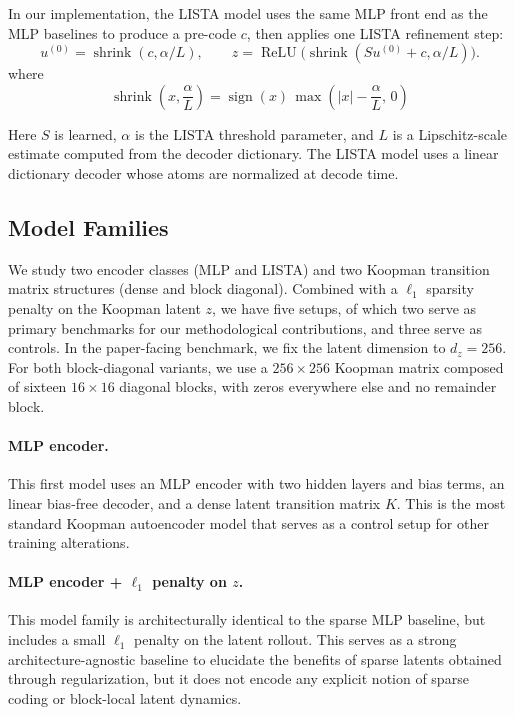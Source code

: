 In our implementation, the LISTA model uses the same MLP front end as the MLP baselines to produce a pre-code $c$, then applies one LISTA refinement step:
\begin{equation}
\label{eq:lista-refinement-step}
u^{(0)} = \operatorname{shrink}(c, \alpha/L),
\qquad
z = \operatorname{ReLU}\!\bigl(\operatorname{shrink}(S u^{(0)} + c, \alpha/L)\bigr).
\end{equation}
where
\begin{equation}
\operatorname{shrink}\!\left(x, \frac{\alpha}{L}\right)
  =
  \operatorname{sign}(x)\,\max\!\left(|x| - \frac{\alpha}{L},\, 0\right)
\end{equation}

Here $S$ is learned, $\alpha$ is the LISTA threshold parameter, and $L$ is a Lipschitz-scale estimate computed from the decoder dictionary. The LISTA model uses a linear dictionary decoder whose atoms are normalized at decode time.

\subsection{Model Families}

We study two encoder classes (MLP and LISTA) and two Koopman transition matrix structures (dense and block diagonal). Combined with a $\ell_1$ sparsity penalty on the Koopman latent $z$, we have five setups, of which two serve as primary benchmarks for our methodological contributions, and three serve as controls.
In the paper-facing benchmark, we fix the latent dimension to $d_z = 256$. For both block-diagonal variants, we use a $256 \times 256$ Koopman matrix composed of sixteen $16 \times 16$ diagonal blocks, with zeros everywhere else and no remainder block.

\paragraph{MLP encoder.} This first model uses an MLP encoder with two hidden layers and bias terms, an linear bias-free decoder, and a dense latent transition matrix $K$. This is the most standard Koopman autoencoder model that serves as a control setup for other training alterations.

\paragraph{MLP encoder + $\ell_1$ penalty on $z$.}
This model family is architecturally identical to the sparse MLP baseline, but includes a small $\ell_1$ penalty on the latent rollout. This serves as a strong architecture-agnostic baseline to elucidate the benefits of sparse latents obtained through regularization, but it does not encode any explicit notion of sparse coding or block-local latent dynamics.

